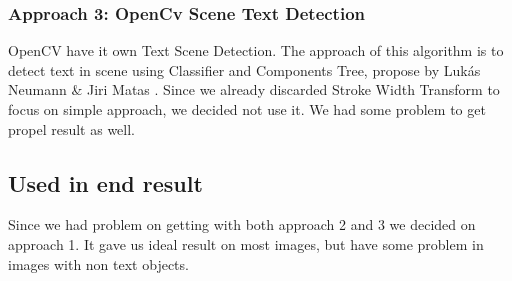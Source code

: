 \documentclass[11pt,a4paper,UKenglish]{report}
\begin{document}
\begin{flushleft}
  \subsubsection{Approach 3: OpenCv Scene Text Detection}
  OpenCV have it own Text Scene Detection. The approach of this algorithm is to detect text in scene using Classifier and Components Tree, propose by Lukás Neumann \& Jiri Matas \cite{neumann_real-time_2012}. Since we already discarded Stroke Width Transform to focus on simple approach, we decided not use it. We had some problem to get propel result as well.
\end{flushleft}

\subsection{Used in end result}
Since we had problem on getting with both approach 2 and 3 we decided on approach 1. It gave us ideal result on most images, but have some problem in images with non text objects.
\end{document}

